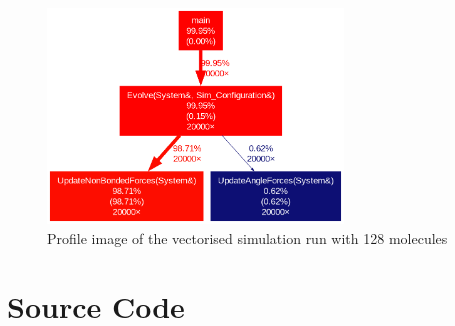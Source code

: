 \documentclass{article}
\begin{document}
\begin{figure}
    \includegraphics[width=0.7\textwidth]{Images/vec_128mol_profile.png
    }
    \centering
    \caption{Profile image of the vectorised simulation run with 128 molecules}
    \label{fig: vec profile 128 molecule}
\end{figure}


\FloatBarrier
\section*{Source Code}

\end{document}
